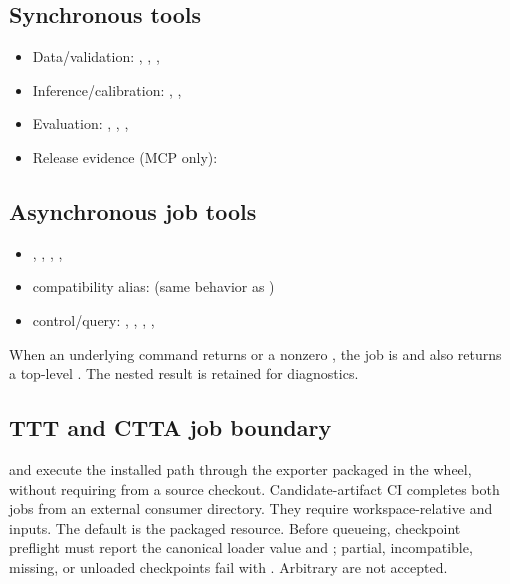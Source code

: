 \subsection{Synchronous tools}
\begin{itemize}
  \item Data/validation: , , , 
  \item Inference/calibration: , , 
  \item Evaluation: , , , 
  \item Release evidence (MCP only): 
\end{itemize}

\subsection{Asynchronous job tools}
\begin{itemize}
  \item {}, , , , 
  \item compatibility alias:  (same behavior as )
  \item control/query: , , , , 
\end{itemize}
When an underlying command returns  or a nonzero
, the job is  and  also returns a
top-level . The nested result is retained for diagnostics.

\subsection{TTT and CTTA job boundary}

 and  execute the installed
 path through the exporter packaged in the wheel, without
requiring  from a source checkout.
Candidate-artifact CI completes both jobs from an external consumer
directory. They require workspace-relative  and
 inputs. The default  is the packaged
 resource. Before queueing, checkpoint preflight must report
the canonical loader value  and
; partial, incompatible, missing, or unloaded
checkpoints fail with . Arbitrary
 are not accepted.

